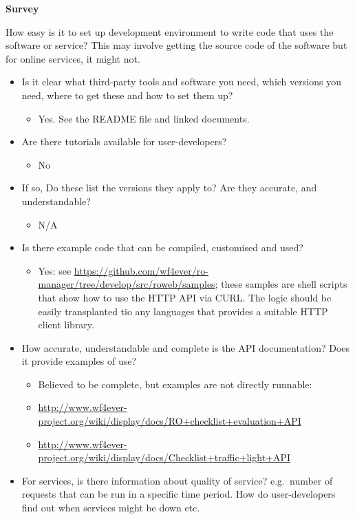 \textbf{Survey}

How easy is it to set up development environment to write code that uses
the software or service? This may involve getting the source code of the
software but for online services, it might not.

\begin{itemize}
\itemsep1pt\parskip0pt
\item
  Is it clear what third-party tools and software you need, which
  versions you need, where to get these and how to set them up?

  \begin{itemize}
  \itemsep1pt\parskip0pt
  \item
    Yes. See the README file and linked documents.
  \end{itemize}
\item
  Are there tutorials available for user-developers?

  \begin{itemize}
  \itemsep1pt\parskip0pt
  \item
    No
  \end{itemize}
\item
  If so, Do these list the versions they apply to? Are they accurate,
  and understandable?

  \begin{itemize}
  \itemsep1pt\parskip0pt
  \item
    N/A
  \end{itemize}
\item
  Is there example code that can be compiled, customised and used?

  \begin{itemize}
  \itemsep1pt\parskip0pt
  \item
    Yes: see
    \url{https://github.com/wf4ever/ro-manager/tree/develop/src/roweb/samples};
    these samples are shell scripts that show how to use the HTTP API
    via CURL. The logic should be easily transplanted tio any languages
    that provides a suitable HTTP client library.
  \end{itemize}
\item
  How accurate, understandable and complete is the API documentation?
  Does it provide examples of use?

  \begin{itemize}
  \itemsep1pt\parskip0pt
  \item
    Believed to be complete, but examples are not directly runnable:
  \item
    \url{http://www.wf4ever-project.org/wiki/display/docs/RO+checklist+evaluation+API}
  \item
    \url{http://www.wf4ever-project.org/wiki/display/docs/Checklist+traffic+light+API}
  \end{itemize}
\item
  For services, is there information about quality of service?
  e.g.~number of requests that can be run in a specific time period. How
  do user-developers find out when services might be down etc.


\end{itemize}
